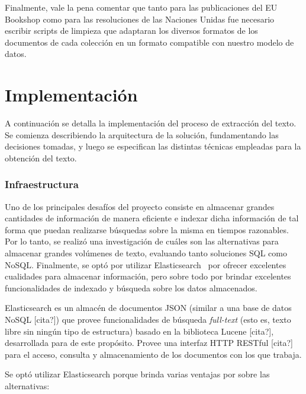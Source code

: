 Finalmente, vale la pena comentar que tanto para las publicaciones del EU Bookshop como para las
resoluciones de las Naciones Unidas fue necesario escribir scripts de limpieza que adaptaran los diversos
formatos de los documentos de cada colección en un formato compatible con nuestro modelo de datos.


\section{Implementación}

A continuación se detalla la implementación del proceso de extracción del texto. Se comienza
describiendo la arquitectura de la solución, fundamentando las decisiones tomadas, y luego se
especifican las distintas técnicas empleadas para la obtención del texto.


\subsubsection{Infraestructura}

Uno de los principales desafíos del proyecto consiste en almacenar grandes cantidades de información
de manera eficiente e indexar dicha información de tal forma que puedan realizarse búsquedas sobre
la misma en tiempos razonables. Por lo tanto, se realizó una investigación de cuáles son las alternativas
para almacenar grandes volúmenes de texto, evaluando tanto soluciones SQL como NoSQL. Finalmente,
se optó por utilizar Elasticsearch~\cite{Elasitcsearch} por ofrecer excelentes cualidades para almacenar
información, pero sobre todo por brindar excelentes funcionalidades de indexado y búsqueda sobre los datos
almacenados.

Elasticsearch es un almacén de documentos JSON (similar a una base de datos NoSQL [cita?]) que provee
funcionalidades de búsqueda \textit{full-text} (esto es, texto libre sin ningún tipo de estructura)
basado en la biblioteca Lucene [cita?], desarrollada para de este propósito. Provee una interfaz
HTTP RESTful [cita?] para el acceso, consulta y almacenamiento de los documentos con los que trabaja.

Se optó utilizar Elasticsearch porque brinda varias ventajas por sobre las alternativas:

